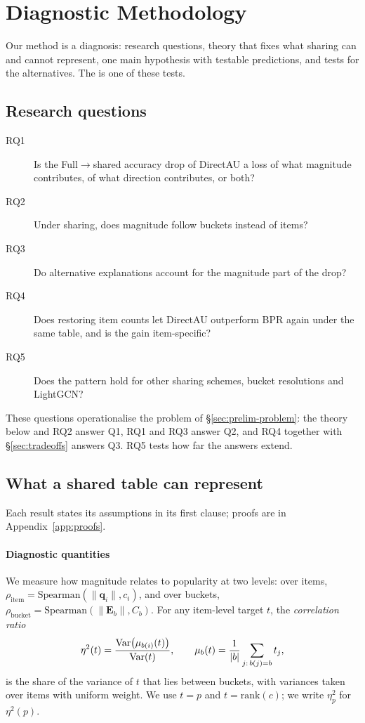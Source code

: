 \section{Diagnostic Methodology}\label{sec:method}
Our method is a diagnosis: research questions, theory that fixes what sharing can and cannot represent, one main hypothesis with testable predictions, and tests for the alternatives. The \crs{} is one of these tests.

\subsection{Research questions}
\begin{description}
\item[RQ1] Is the Full$\to$shared accuracy drop of DirectAU a loss of what magnitude contributes, of what direction contributes, or both?
\item[RQ2] Under sharing, does magnitude follow buckets instead of items?
\item[RQ3] Do alternative explanations account for the magnitude part of the drop?
\item[RQ4] Does restoring item counts let DirectAU outperform BPR again under the same table, and is the gain item-specific?
\item[RQ5] Does the pattern hold for other sharing schemes, bucket resolutions and LightGCN?
\end{description}
These questions operationalise the problem of \S\ref{sec:prelim-problem}: the theory below and RQ2 answer Q1, RQ1 and RQ3 answer Q2, and RQ4 together with \S\ref{sec:tradeoffs} answers Q3. RQ5 tests how far the answers extend.

\subsection{What a shared table can represent}\label{sec:theory}
Each result states its assumptions in its first clause; proofs are in Appendix~\ref{app:proofs}.

\paragraph{Diagnostic quantities}
We measure how magnitude relates to popularity at two levels: over items, $\rho_{\mathrm{item}}=\mathrm{Spearman}(\|\mathbf{q}_i\|,c_i)$, and over buckets, $\rho_{\mathrm{bucket}}=\mathrm{Spearman}(\|\mathbf{E}_b\|,C_b)$. For any item-level target $t$, the \emph{correlation ratio}
\begin{equation}\label{eq:eta}
\eta^2(t)=\frac{\operatorname{Var}\bigl(\mu_{b(i)}(t)\bigr)}{\operatorname{Var}(t)},\qquad \mu_b(t)=\frac{1}{|b|}\sum_{j:\,b(j)=b}t_j,
\end{equation}
is the share of the variance of $t$ that lies between buckets, with variances taken over items with uniform weight. We use $t=p$ and $t=\mathrm{rank}(c)$; we write $\eta^2_p$ for $\eta^2(p)$.

